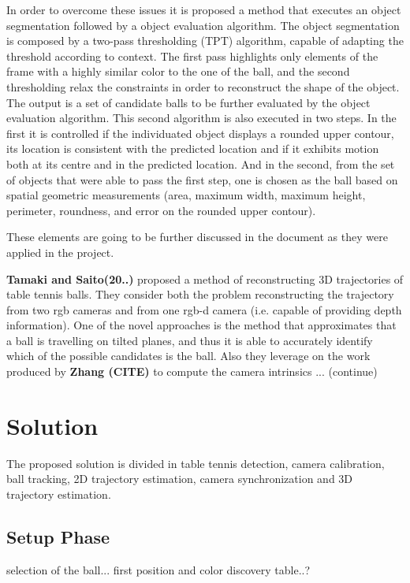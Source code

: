 \documentclass[a4paper]{article}
\begin{document}
In order to overcome these issues it is proposed a method that executes an object segmentation followed by a object evaluation algorithm. The object segmentation is composed by a two-pass thresholding (TPT) algorithm, capable of adapting the threshold according to context. The first pass highlights only elements of the frame with a highly similar color to the one of the ball, and the second thresholding relax the constraints in order to reconstruct the shape of the object. The output is a set of candidate balls to be further evaluated by the object evaluation algorithm. This second algorithm is also executed in two steps. In the first it is controlled if the individuated object displays a rounded upper  contour, its location is consistent with the predicted location and if it exhibits motion both at its centre and in the predicted location. And in the second, from the set of objects that were able to pass the first step, one is chosen as the ball based on spatial geometric measurements (area, maximum width, maximum height, perimeter, roundness, and error on the rounded upper contour).

These elements are going to be further discussed in the document as they were applied in the project. 

\textbf{Tamaki and Saito(20..)} proposed a method of reconstructing 3D trajectories of table tennis balls. They consider both the problem reconstructing the trajectory from two rgb cameras and from one rgb-d camera (i.e. capable of providing depth information). One of the novel approaches is the method that approximates that a ball is travelling on tilted planes, and thus it is able to accurately identify which of the possible candidates is the ball. Also they leverage on the work produced by\textbf{ Zhang (CITE)} to compute the camera intrinsics ... (continue)


\section{Solution}

The proposed solution is divided in table tennis detection, camera calibration, ball tracking, 2D trajectory estimation, camera synchronization and 3D trajectory estimation. 

\subsection{Setup Phase}
	selection of the ball... first position and color discovery
	table..?
\end{document}
